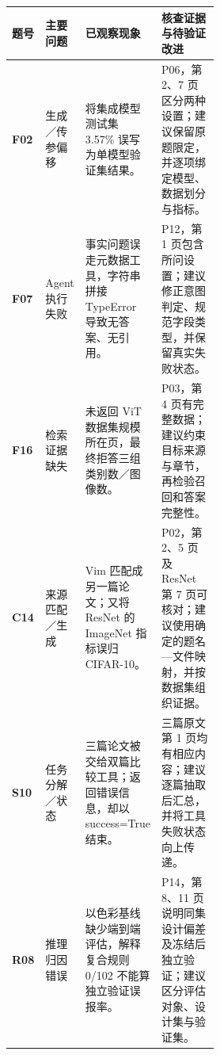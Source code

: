 \begingroup
\footnotesize
\setlength{\tabcolsep}{5pt}
\renewcommand{\arraystretch}{1.2}
\begin{tabularx}{\linewidth}{@{}p{0.06\linewidth}p{0.15\linewidth}p{0.31\linewidth}>{\raggedright\arraybackslash}X@{}}
\toprule
题号 & 主要问题 & 已观察现象 & 核查证据与待验证改进 \\
\midrule
\textbf{F02} & 生成／传参偏移 & 将集成模型测试集 3.57\% 误写为单模型验证集结果。 & P06，第 2、7 页区分两种设置；建议保留原题限定，并逐项绑定模型、数据划分与指标。 \\
\addlinespace[4pt]
\textbf{F07} & Agent 执行失败 & 事实问题误走元数据工具，字符串拼接 TypeError 导致无答案、无引用。 & P12，第 1 页包含所问设置；建议修正意图判定、规范字段类型，并保留真实失败状态。 \\
\addlinespace[4pt]
\textbf{F16} & 检索证据缺失 & 未返回 ViT 数据集规模所在页，最终拒答三组类别数／图像数。 & P03，第 4 页有完整数据；建议约束目标来源与章节，再检验召回和答案完整性。 \\
\addlinespace[4pt]
\textbf{C14} & 来源匹配／生成 & Vim 匹配成另一篇论文；又将 ResNet 的 ImageNet 指标误归 CIFAR-10。 & P02，第 2、5 页及 ResNet 第 7 页可核对；建议使用确定的题名—文件映射，并按数据集组织证据。 \\
\addlinespace[4pt]
\textbf{S10} & 任务分解／状态 & 三篇论文被交给双篇比较工具；返回错误信息，却以 success=True 结束。 & 三篇原文第 1 页均有相应内容；建议逐篇抽取后汇总，并将工具失败状态向上传递。 \\
\addlinespace[4pt]
\textbf{R08} & 推理归因错误 & 以色彩基线缺少端到端评估，解释复合规则 0/102 不能算独立验证误报率。 & P14，第 8、11 页说明同集设计偏差及冻结后独立验证；建议区分评估对象、设计集与验证集。 \\
\bottomrule
\end{tabularx}
\par\vspace{4pt}{\footnotesize 案例由冻结的 AI 辅助评分与实际结果归纳；P 编号对应文献表，页码均为 PDF 物理页。改进为待实施、待复测建议，不代表已取得优化后结果。\par}
\endgroup
